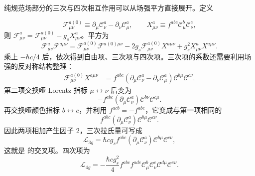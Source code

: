 \begin{derivation}
纯规范场部分的三次与四次相互作用可以从场强平方直接展开。定义

\begin{equation*}
\mathcal F_{\mu\nu}^{a(0)}\equiv
\partial_\mu\mathscr C_\nu^a-\partial_\nu\mathscr C_\mu^a,
\qquad
X_{\mu\nu}^a\equiv f^{abc}\mathscr C_\mu^b\mathscr C_\nu^c,
\end{equation*}
则 $\mathcal F_{\mu\nu}^a=\mathcal F_{\mu\nu}^{a(0)}-g_sX_{\mu\nu}^a$。平方为
\begin{equation*}
\mathcal F_{\mu\nu}^a\mathcal F^{a\mu\nu}
=\mathcal F_{\mu\nu}^{a(0)}\mathcal F^{a(0)\mu\nu}
-2g_s\mathcal F_{\mu\nu}^{a(0)}X^{a\mu\nu}
+g_s^2X_{\mu\nu}^aX^{a\mu\nu}.
\end{equation*}
乘上 $-\hbar c/4$ 后，依次得到自由项、三次项与四次项。三次项的系数还需要利用场强的反对称结构整理：
\begin{align*}
\mathcal F_{\mu\nu}^{a(0)}X^{a\mu\nu}
&=f^{abc}(\partial_\mu\mathscr C_\nu^a-\partial_\nu\mathscr C_\mu^a)
\mathscr C^{b\mu}\mathscr C^{c\nu}.
\end{align*}
第二项交换哑 Lorentz 指标 $\mu\leftrightarrow\nu$ 后变为
\begin{equation*}
-f^{abc}(\partial_\mu\mathscr C_\nu^a)
\mathscr C^{b\nu}\mathscr C^{c\mu}.
\end{equation*}
再交换哑颜色指标 $b\leftrightarrow c$，并利用 $f^{acb}=-f^{abc}$，它变成与第一项相同的
\begin{equation*}
f^{abc}(\partial_\mu\mathscr C_\nu^a)
\mathscr C^{b\mu}\mathscr C^{c\nu}.
\end{equation*}
因此两项相加产生因子 $2$，三次拉氏量可写成
\begin{equation*}
\mathcal L_{3g}
=\hbar c g_s f^{abc}(\partial_\mu\mathscr C_\nu^a)
\mathscr C^{b\mu}\mathscr C^{c\nu},
\end{equation*}
这就是 的交叉项。四次项为
\begin{equation*}
\mathcal L_{4g}
=-\frac{\hbar c g_s^2}{4}
 f^{abc}f^{ade}
 \mathscr C_\mu^b\mathscr C_\nu^c
 \mathscr C^{d\mu}\mathscr C^{e\nu}.
\end{equation*}

\end{derivation}

